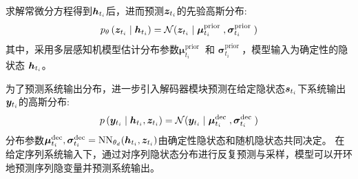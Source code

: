 求解常微分方程得到$\boldsymbol{h}_{t_i}$后，进而预测$\boldsymbol{z}_{t_i}$的先验高斯分布:
\begin{equation}
  p_{\theta}\left(\boldsymbol{z}_{t_{i}} \mid \boldsymbol{h}_{t_{i}}\right) = \mathcal{N}(\boldsymbol{z}_{t_i}\mid\boldsymbol{\mu}_{t_i}^{\text {prior }}, \boldsymbol{\sigma}_{t_i}^{\text {prior }})  
  \label{equ:prior_z}
\end{equation}
其中，采用多层感知机模型估计分布参数$\boldsymbol{\mu}_{t_i}^{\text {prior }}$ 和 $\boldsymbol{\sigma}_{t_i}^{\text {prior }}$，模型输入为确定性的隐状态 $\boldsymbol{h}_{t_i}$。

为了预测系统输出分布，进一步引入解码器模块预测在给定隐状态$\boldsymbol{s}_{t_i}$下系统输出$\boldsymbol{y}_{t_i}$的高斯分布:
\begin{equation}
    p\left(\boldsymbol{y}_{t_{i}} \mid \boldsymbol{h}_{t_{i}}, \boldsymbol{z}_{t_i}\right) = \mathcal{N}(\boldsymbol{y}_{t_i} \mid\boldsymbol{\mu}_{t_i}^{\text {dec }}, \boldsymbol{\sigma}_{t_i}^{\text {dec }})
    \label{equ:output_layer}
\end{equation}
分布参数$\boldsymbol{\mu}_{t_i}^{\text {dec}}, \boldsymbol{\sigma}_{t_i}^{\text {dec}}=\text{NN}_{\theta_d}(\boldsymbol{h}_{t_{i}}, \boldsymbol{z}_{t_i})$由确定性隐状态和随机隐状态共同决定。
在给定序列系统输入下，通过对序列隐状态分布进行反复预测与采样，模型可以开环地预测序列隐变量并预测系统输出。


